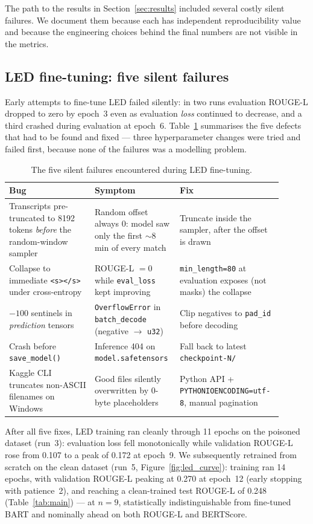 \documentclass[10pt,a4paper]{article}
\begin{document}
The path to the results in Section~\ref{sec:results} included several costly silent failures. We document them because each has independent reproducibility value and because the engineering choices behind the final numbers are not visible in the metrics.

\subsection{LED fine-tuning: five silent failures}
Early attempts to fine-tune LED failed silently: in two runs evaluation ROUGE-L dropped to zero by epoch~3 even as evaluation \emph{loss} continued to decrease, and a third crashed during evaluation at epoch~6. Table~\ref{tab:bugs} summarises the five defects that had to be found and fixed --- three hyperparameter changes were tried and failed first, because none of the failures was a modelling problem.

\begin{table}[h]
\centering\small
\begin{tabular}{p{0.30\linewidth}p{0.28\linewidth}p{0.32\linewidth}}
\toprule
\textbf{Bug} & \textbf{Symptom} & \textbf{Fix} \\
\midrule
Transcripts pre-truncated to 8192 tokens \emph{before} the random-window sampler & Random offset always 0: model saw only the first $\sim$8 min of every match & Truncate inside the sampler, after the offset is drawn \\
Collapse to immediate \texttt{<s></s>} under cross-entropy & ROUGE-L $=0$ while \texttt{eval\_loss} kept improving & \texttt{min\_length=80} at evaluation exposes (not masks) the collapse \\
$-100$ sentinels in \emph{prediction} tensors & \texttt{OverflowError} in \texttt{batch\_decode} (negative $\to$ \texttt{u32}) & Clip negatives to \texttt{pad\_id} before decoding \\
Crash before \texttt{save\_model()} & Inference 404 on \texttt{model.safetensors} & Fall back to latest \texttt{checkpoint-N/} \\
Kaggle CLI truncates non-ASCII filenames on Windows & Good files silently overwritten by 0-byte placeholders & Python API + \texttt{PYTHONIOENCODING=utf-8}, manual pagination \\
\bottomrule
\end{tabular}
\caption{The five silent failures encountered during LED fine-tuning.}
\label{tab:bugs}
\end{table}

After all five fixes, LED training ran cleanly through 11 epochs on the poisoned dataset (run~3): evaluation loss fell monotonically while validation ROUGE-L rose from 0.107 to a peak of 0.172 at epoch~9. We subsequently retrained from scratch on the clean dataset (run~5, Figure~\ref{fig:led_curve}): training ran 14 epochs, with validation ROUGE-L peaking at 0.270 at epoch~12 (early stopping with patience~2), and reaching a clean-trained test ROUGE-L of 0.248 (Table~\ref{tab:main}) --- at $n=9$, statistically indistinguishable from fine-tuned BART and nominally ahead on both ROUGE-L and BERTScore.
\end{document}
